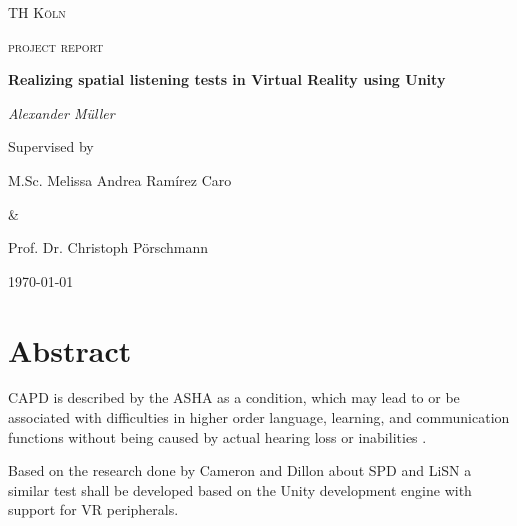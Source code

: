 \documentclass[a4paper,11pt]{article}%
\renewcommand{\\}{\vspace*{0.5\baselineskip} \newline}
\begin{document}

\begin{titlepage}
	\centering
	{\scshape\LARGE TH Köln \par}
	\vspace{1cm}
	{\scshape\Large project report\par}
	\vspace{1.5cm}
	{\huge\bfseries Realizing spatial listening tests in Virtual Reality using Unity\par}
	\vspace{2cm}
	{\Large\itshape Alexander Müller \par}
	\vfill
	Supervised by\par
	M.Sc. Melissa Andrea Ramírez Caro \par \&  \par Prof. Dr. Christoph Pörschmann
	\vfill

	{\large \today\par}
\end{titlepage}


\newpage

\tableofcontents
\newpage



\section{Abstract}
\ac{CAPD} is described by the \ac{ASHA} as a condition, which \dq may lead to or be associated with difficulties in higher order language, learning, and communication functions\dq{} without being caused by actual hearing loss or inabilities \cite{ASHA}.

Based on the research done by Cameron and Dillon about \ac{SPD} and \ac{LiSN} a similar test shall be developed based on the Unity development engine with support for \ac{VR} peripherals.

\end{document}
